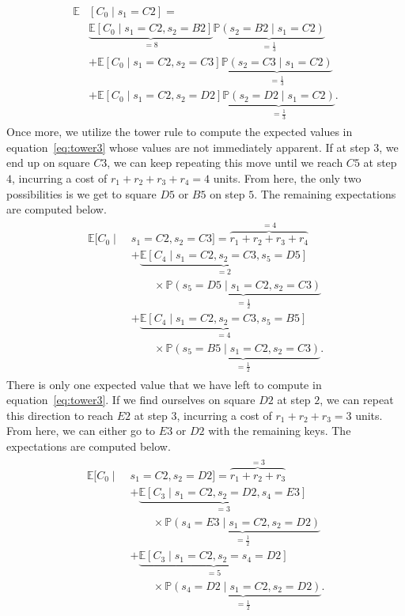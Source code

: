 \begin{align}
    \begin{split}
    \mathbb{E}&\left[ C_0 \mid s_1 = C2 \right] = \\
    &\underbrace{\mathbb{E}[C_0 \mid s_1 = C2, s_2 = B2]}_{=8} \underbrace{\mathbb{P}(s_2 = B2 \mid s_1 = C2)}_{=\frac{1}{3}} \\
    &+ \mathbb{E}[C_0 \mid s_1=C2, s_2 = C3] \underbrace{\mathbb{P}(s_2 = C3 \mid s_1 = C2)}_{=\frac{1}{3}} \\
    &+ \mathbb{E}[C_0 \mid s_1 = C2, s_2 = D2] \underbrace{\mathbb{P}(s_2 = D2 \mid s_1 = C2)}_{=\frac{1}{3}}.
    \end{split}
    \label{eq:tower3}
\end{align}
%
Once more, we utilize the tower rule to compute the expected values in
equation~\eqref{eq:tower3} whose values are not immediately apparent. If at step
$3$, we end up on square $C3$, we can keep repeating this move until we reach
$C5$ at step $4$, incurring a cost of $r_1 + r_2 + r_3 + r_4 = 4$ units. From
here, the only two possibilities is we get to square $D5$ or $B5$ on step $5$. 
The remaining expectations are computed below.
%
\begin{align*}
    \begin{split}
    \mathbb{E}[C_0 \mid \; &s_1=C2, s_2=C3] = \overbrace{r_1 + r_2 + r_3 + r_4}^{=4} \\
    &+ \underbrace{\mathbb{E}[C_4 \mid s_1=C2, s_2=C3, s_5=D5]}_{=2} \\ &{\phantom{1234}}\times \underbrace{\mathbb{P}(s_5=D5 \mid s_1=C2, s_2=C3)}_{=\frac{1}{2}} \\
    &+ \underbrace{\mathbb{E}[C_4 \mid s_1=C2, s_2=C3, s_5=B5]}_{=4} \\ &{\phantom{1234}} \times \underbrace{\mathbb{P}(s_5=B5 \mid s_1=C2, s_2=C3)}_{=\frac{1}{2}}.
    \end{split}
\end{align*}
%
There is only one expected value that we have left to compute in
equation~\eqref{eq:tower3}. If we find ourselves on square $D2$ at step $2$, we 
can repeat this direction to reach $E2$ at step $3$, incurring a cost of 
$r_1 + r_2 + r_3 = 3$ units. From here, we can either go to $E3$ or $D2$ with 
the remaining keys. The expectations are computed below.
%
\vspace{-2mm}
\begin{align*}
    \begin{split}
    \mathbb{E}[C_0 \mid \; &s_1=C2, s_2=D2] = \overbrace{r_1 + r_2 + r_3}^{=3} \\
    &+ \underbrace{\mathbb{E}[C_3 \mid s_1=C2, s_2=D2, s_4=E3]}_{=3} \\ &{\phantom{1234}}\times \underbrace{\mathbb{P}(s_4=E3 \mid s_1=C2, s_2=D2)}_{=\frac{1}{2}} \\
    &+ \underbrace{\mathbb{E}[C_3 \mid s_1=C2, s_2=s_4=D2]}_{=5} \\ &{\phantom{1234}}\times \underbrace{\mathbb{P}(s_4=D2 \mid s_1=C2, s_2=D2)}_{=\frac{1}{2}}.
    \end{split}
\end{align*}
